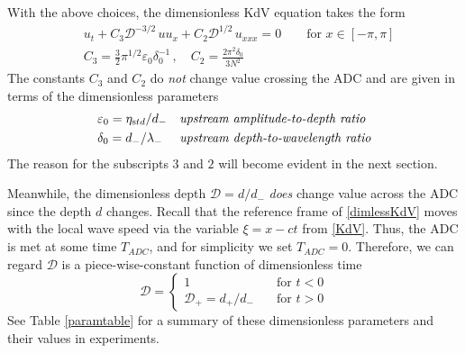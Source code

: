\documentclass[11pt]{article}
\newcommand{\eps}{\varepsilon}
\newcommand{\etastd}{\eta_{\text std}}
\newcommand{\depth}{d}
\newcommand{\dup}{\depth_{-}}
\newcommand{\ddn}{\depth_{+}}
\newcommand{\lam}{\lambda}
\newcommand{\lamup}{\lam_{-}}
\newcommand{\lamfac}{N}
\newcommand{\drat}{\mathcal{D}}
\newcommand{\dratdn}{\drat_+}
\newcommand{\epsup}{\eps_0}
\newcommand{\delup}{\delta_0}
\begin{document}
With the above choices, the dimensionless KdV equation takes the form
\begin{align}
\label{dimlessKdV}
&u_t + C_3 \drat^{-3/2} \, u u_x + C_2 \drat^{1/2} \, u_{xxx} = 0
\qquad \text{for } x \in [-\pi,\pi] \\
\label{C3C2}
&C_3 = \frac{3}{2} \pi^{1/2} \epsup \delup^{-1} \, , \quad
C_2 = \frac{2 \pi^2 \delup}{3 \lamfac^2} 
\end{align}
The constants $C_3$ and $C_2$ do {\em not} change value crossing the ADC and are given in terms of the dimensionless parameters
\begin{align}
&\epsup = \etastd / \dup
&&\mbox{\em upstream amplitude-to-depth ratio} \\
&\delup = \dup / \lamup
&&\mbox{\em upstream depth-to-wavelength ratio}
\end{align}
The reason for the subscripts $3$ and $2$ will become evident in the next section. 

Meanwhile, the dimensionless depth $\drat = {\depth}/{\dup}$ {\em does} change value across the ADC since the depth $\depth$ changes. Recall that the reference frame of \eqref{dimlessKdV} moves with the local wave speed via the variable $\xi = x-ct$ from \eqref{KdV}. Thus, the ADC is met at some time $T_{ADC}$, and for simplicity we set $T_{ADC} = 0$. Therefore, we can regard $\drat$ is a piece-wise-constant function of dimensionless time
\begin{equation}
\label{dratpw}
\drat = 
\begin{cases}
1 		&\quad \mbox{for } {t}<0 \\
\dratdn = {\ddn}/{\dup} 	&\quad \mbox{for } {t}>0
\end{cases}
\end{equation}
See Table \ref{paramtable} for a summary of these dimensionless parameters and their values in experiments.
\end{document}
